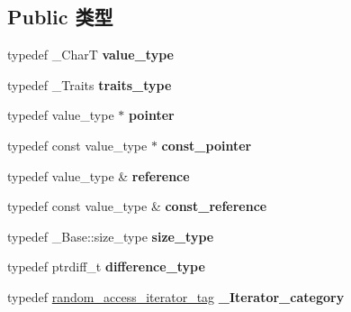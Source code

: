 \subsection*{Public 类型}
\begin{DoxyCompactItemize}
\item 
\mbox{\label{classbasic__string_a91e68c94b68166fbfcae9189be179787}} 
typedef \+\_\+\+CharT {\bfseries value\+\_\+type}
\item 
\mbox{\label{classbasic__string_a7a03b9bd78ff5d1b86df9a7a175dba6c}} 
typedef \+\_\+\+Traits {\bfseries traits\+\_\+type}
\item 
\mbox{\label{classbasic__string_a3803e42391267da7ea4c29b72e282b30}} 
typedef value\+\_\+type $\ast$ {\bfseries pointer}
\item 
\mbox{\label{classbasic__string_a82d48ef13de39d5f6f30a64e44bdf0d1}} 
typedef const value\+\_\+type $\ast$ {\bfseries const\+\_\+pointer}
\item 
\mbox{\label{classbasic__string_a780a3a39f1b56657ccf9879740c31a81}} 
typedef value\+\_\+type \& {\bfseries reference}
\item 
\mbox{\label{classbasic__string_ae612697a8445ff4f55666e78db9d420a}} 
typedef const value\+\_\+type \& {\bfseries const\+\_\+reference}
\item 
\mbox{\label{classbasic__string_a401c6bcec3f0e0b3d4f673008188b503}} 
typedef \+\_\+\+Base\+::size\+\_\+type {\bfseries size\+\_\+type}
\item 
\mbox{\label{classbasic__string_a5c4760031853d59511ce2444bf8d6e02}} 
typedef ptrdiff\+\_\+t {\bfseries difference\+\_\+type}
\item 
\mbox{\label{classbasic__string_affe8d4f31b1a7a73404413ca9f47980c}} 
typedef \hyperlink{structrandom__access__iterator__tag}{random\+\_\+access\+\_\+iterator\+\_\+tag} {\bfseries \+\_\+\+Iterator\+\_\+category}
\item 
\mbox{\label{classbasic__string_a5dc88061485a9318d7caabec2a77dad3}} 

\end{DoxyCompactItemize}
